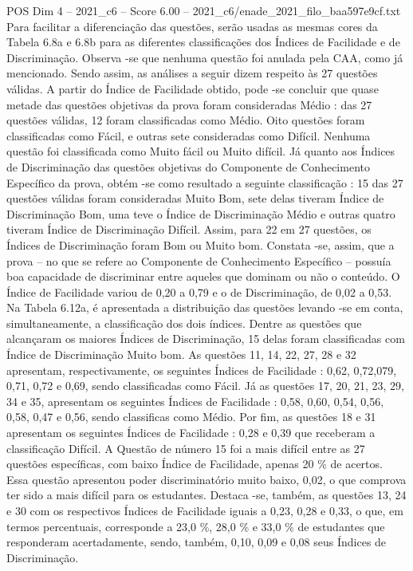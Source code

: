\begin{textsample}{POS Dim 4 – 2021\_c6 – Score 6.00 – 2021\_c6/enade\_2021\_filo\_baa597e9cf.txt}
Para facilitar a diferenciação das questões, serão usadas as mesmas cores da Tabela 6.8a e 6.8b para as diferentes classificações dos Índices de Facilidade e de Discriminação.
Observa -se que nenhuma questão foi anulada pela CAA, como já mencionado.
Sendo assim, as análises a seguir dizem respeito às 27 questões válidas.
A partir do Índice de Facilidade obtido, pode -se concluir que quase metade das questões objetivas da prova foram consideradas Médio : das 27 questões válidas, 12 foram classificadas como Médio.
Oito questões foram classificadas como Fácil, e outras sete consideradas como Difícil.
Nenhuma questão foi classificada como Muito fácil ou Muito difícil.
Já quanto aos Índices de Discriminação das questões objetivas do Componente de Conhecimento Específico da prova, obtém -se como resultado a seguinte classificação : 15 das 27 questões válidas foram consideradas Muito Bom, sete delas tiveram Índice de Discriminação Bom, uma teve o Índice de Discriminação Médio e outras quatro tiveram Índice de Discriminação Difícil.
Assim, para 22 em 27 questões, os Índices de Discriminação foram Bom ou Muito bom.
Constata -se, assim, que a prova – no que se refere ao Componente de Conhecimento Específico – possuía boa capacidade de discriminar entre aqueles que dominam ou não o conteúdo.
O Índice de Facilidade variou de 0,20 a 0,79 e o de Discriminação, de 0,02 a 0,53.
Na Tabela 6.12a, é apresentada a distribuição das questões levando -se em conta, simultaneamente, a classificação dos dois índices.
Dentre as questões que alcançaram os maiores Índices de Discriminação, 15 delas foram classificadas com Índice de Discriminação Muito bom.
As questões 11, 14, 22, 27, 28 e 32 apresentam, respectivamente, os seguintes Índices de Facilidade : 0,62, 0,72,079, 0,71, 0,72 e 0,69, sendo classificadas como Fácil.
Já as questões 17, 20, 21, 23, 29, 34 e 35, apresentam os seguintes Índices de Facilidade : 0,58, 0,60, 0,54, 0,56, 0,58, 0,47 e 0,56, sendo classificas como Médio.
Por fim, as questões 18 e 31 apresentam os seguintes Índices de Facilidade : 0,28 e 0,39 que receberam a classificação Difícil.
A Questão de número 15 foi a mais difícil entre as 27 questões específicas, com baixo Índice de Facilidade, apenas 20 \% de acertos.
Essa questão apresentou poder discriminatório muito baixo, 0,02, o que comprova ter sido a mais difícil para os estudantes.
Destaca -se, também, as questões 13, 24 e 30 com os respectivos Índices de Facilidade iguais a 0,23, 0,28 e 0,33, o que, em termos percentuais, corresponde a 23,0 \%, 28,0 \% e 33,0 \% de estudantes que responderam acertadamente, sendo, também, 0,10, 0,09 e 0,08 seus Índices de Discriminação.

\end{textsample}
